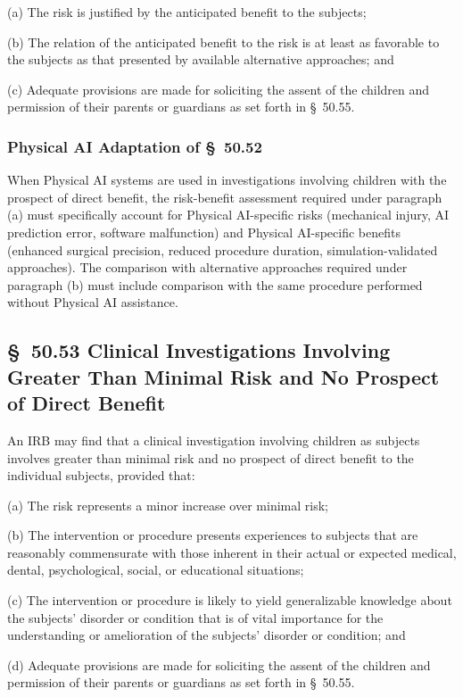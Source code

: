 (a) The risk is justified by the anticipated benefit to the subjects;

(b) The relation of the anticipated benefit to the risk is at least as favorable to the subjects as that presented by available alternative approaches; and

(c) Adequate provisions are made for soliciting the assent of the children and permission of their parents or guardians as set forth in \S~50.55.

\subsubsection{Physical AI Adaptation of \S~50.52}

When Physical AI systems are used in investigations involving children with the prospect of direct benefit, the risk-benefit assessment required under paragraph (a) must specifically account for Physical AI-specific risks (mechanical injury, AI prediction error, software malfunction) and Physical AI-specific benefits (enhanced surgical precision, reduced procedure duration, simulation-validated approaches). The comparison with alternative approaches required under paragraph (b) must include comparison with the same procedure performed without Physical AI assistance.

\subsection{\S~50.53 Clinical Investigations Involving Greater Than Minimal Risk and No Prospect of Direct Benefit}

An IRB may find that a clinical investigation involving children as subjects involves greater than minimal risk and no prospect of direct benefit to the individual subjects, provided that:

(a) The risk represents a minor increase over minimal risk;

(b) The intervention or procedure presents experiences to subjects that are reasonably commensurate with those inherent in their actual or expected medical, dental, psychological, social, or educational situations;

(c) The intervention or procedure is likely to yield generalizable knowledge about the subjects' disorder or condition that is of vital importance for the understanding or amelioration of the subjects' disorder or condition; and

(d) Adequate provisions are made for soliciting the assent of the children and permission of their parents or guardians as set forth in \S~50.55.

